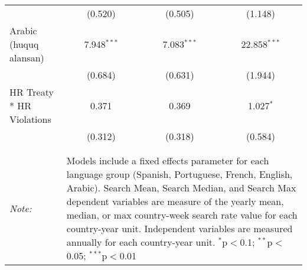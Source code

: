 \begin{table}[!htbp]
\begin{tabular}{@{\extracolsep{5pt}}lccc}
  & (0.520) & (0.505) & (1.148) \\ 
  Arabic (huquq alansan) & 7.948$^{***}$ & 7.083$^{***}$ & 22.858$^{***}$ \\ 
  & (0.684) & (0.631) & (1.944) \\ 
  HR Treaty * HR Violations & 0.371 & 0.369 & 1.027$^{*}$ \\ 
  & (0.312) & (0.318) & (0.584) \\ 
 \hline \\[-1.8ex] 
\hline 
\hline \\[-1.8ex] 
\textit{Note:}  & \multicolumn{3}{l}{\parbox[t]{8cm}{Models include a fixed effects parameter for each language group (Spanish, Portuguese, French, English, Arabic). Search Mean, Search Median, and Search Max dependent variables are measure of the yearly mean, median, or max country-week search rate value for each country-year unit. Independent variables are measured annually for each country-year unit. $^{*}$p$<$0.1; $^{**}$p$<$0.05; $^{***}$p$<$0.01}} \\ 
\end{tabular} 
\end{table} 

